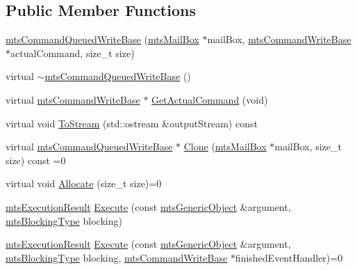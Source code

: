 \subsection*{Public Member Functions}
\begin{DoxyCompactItemize}
\item 
\hyperlink{classmts_command_queued_write_base_a3acce98115e1e2ebc41079f22ed1b30e}{mts\+Command\+Queued\+Write\+Base} (\hyperlink{classmts_mail_box}{mts\+Mail\+Box} $\ast$mail\+Box, \hyperlink{classmts_command_write_base}{mts\+Command\+Write\+Base} $\ast$actual\+Command, size\+\_\+t size)
\item 
virtual \hyperlink{classmts_command_queued_write_base_a67b0676e10efe628b44930d9b5a1f12f}{$\sim$mts\+Command\+Queued\+Write\+Base} ()
\item 
virtual \hyperlink{classmts_command_write_base}{mts\+Command\+Write\+Base} $\ast$ \hyperlink{classmts_command_queued_write_base_a7e97a8a3bc60fca2ba15bd335a8838b6}{Get\+Actual\+Command} (void)
\item 
virtual void \hyperlink{classmts_command_queued_write_base_a8c3b9a68b2f3067d1e4974f963fd9d23}{To\+Stream} (std\+::ostream \&output\+Stream) const 
\item 
virtual \hyperlink{classmts_command_queued_write_base}{mts\+Command\+Queued\+Write\+Base} $\ast$ \hyperlink{classmts_command_queued_write_base_af5ad182c80a9c5660d9da1afa425f417}{Clone} (\hyperlink{classmts_mail_box}{mts\+Mail\+Box} $\ast$mail\+Box, size\+\_\+t size) const =0
\item 
virtual void \hyperlink{classmts_command_queued_write_base_a4c913b692d849b9aa47f3c9ea235cd8f}{Allocate} (size\+\_\+t size)=0
\item 
\hyperlink{classmts_execution_result}{mts\+Execution\+Result} \hyperlink{classmts_command_queued_write_base_a6d7fa71986aac29927898583c4c1f1f9}{Execute} (const \hyperlink{classmts_generic_object}{mts\+Generic\+Object} \&argument, \hyperlink{mts_forward_declarations_8h_ad7426ccb6c883bc780d0ee197dddcbe7}{mts\+Blocking\+Type} blocking)
\item 
\hyperlink{classmts_execution_result}{mts\+Execution\+Result} \hyperlink{classmts_command_queued_write_base_af7ee7e7dd5d775d48ff191661ae7c376}{Execute} (const \hyperlink{classmts_generic_object}{mts\+Generic\+Object} \&argument, \hyperlink{mts_forward_declarations_8h_ad7426ccb6c883bc780d0ee197dddcbe7}{mts\+Blocking\+Type} blocking, \hyperlink{classmts_command_write_base}{mts\+Command\+Write\+Base} $\ast$finished\+Event\+Handler)=0
\item 

\end{DoxyCompactItemize}
